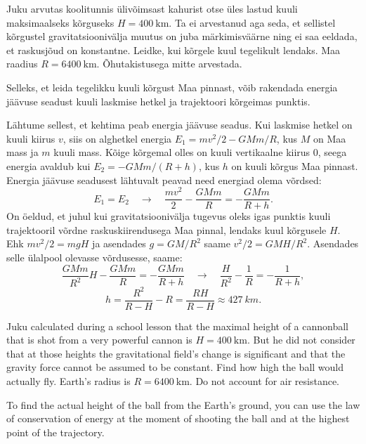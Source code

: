 
Juku arvutas koolitunnis ülivõimsast kahurist otse üles lastud kuuli maksimaalseks kõrguseks $H=\SI{400}{\km}$. Ta ei arvestanud aga seda, et sellistel kõrgustel gravitatsioonivälja muutus on juba märkimisväärne ning ei saa eeldada, et raskusjõud on konstantne. Leidke, kui kõrgele kuul tegelikult lendaks. Maa raadius $R=\SI{6400}{\km}$. Õhutakistusega mitte arvestada.

\hint
Selleks, et leida tegelikku kuuli kõrgust Maa pinnast, võib rakendada energia jäävuse seadust kuuli laskmise hetkel ja trajektoori kõrgeimas punktis.

\solu
Lähtume sellest, et kehtima peab energia jäävuse seadus. Kui laskmise hetkel on kuuli kiirus $v$, siis on alghetkel energia $E_1 = mv^2/2 - GMm/R$, kus $M$ on Maa mass ja $m$ kuuli mass. Kõige kõrgemal olles on kuuli vertikaalne kiirus \num{0}, seega energia avaldub kui $E_2 = -GMm/(R+h)$, kus $h$ on kuuli kõrgus Maa pinnast. Energia jäävuse seadusest lähtuvalt peavad need energiad olema võrdsed:$$E_1 = E_2 \quad\rightarrow\quad \frac{mv^2}{2} - \frac{GMm}{R} = -\frac{GMm}{R+h}.$$
On öeldud, et juhul kui gravitatsioonivälja tugevus oleks igas punktis kuuli trajektooril võrdne raskuskiirendusega Maa pinnal, lendaks kuul kõrgusele $H$. Ehk $mv^2/2=mgH$ ja asendades $g=GM/R^2$ saame $v^2/2=GMH/R^2$. Asendades selle ülalpool olevasse võrdusesse, saame:
$$\frac{GMm}{R^2}H - \frac{GMm}{R} = -\frac{GMm}{R+h} \quad\rightarrow\quad \frac{H}{R^2}-\frac{1}{R} = - \frac{1}{R+h},$$
$$h=\frac{R^2}{R-H} - R = \frac{RH}{R-H} \approx \SI{427}{km}.$$

Juku calculated during a school lesson that the maximal height of a cannonball that is shot from a very powerful cannon is $H=\SI{400}{\km}$. But he did not consider that at those heights the gravitational field’s change is significant and that the gravity force cannot be assumed to be constant. Find how high the ball would actually fly. Earth’s radius is $R=\SI{6400}{\km}$. Do not account for air resistance.

\hinteng
To find the actual height of the ball from the Earth’s ground, you can use the law of conservation of energy at the moment of shooting the ball and at the highest point of the trajectory.

